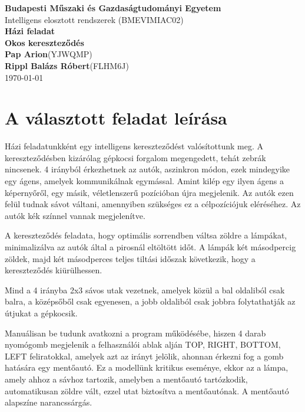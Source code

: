\documentclass[a4paper, 11pt]{article}
\begin{document}
\begin{titlepage}

    \begin{center}
        \vspace{0.3cm}
        \textbf{Budapesti Műszaki és Gazdaságtudományi Egyetem}\\
        \textmd{Intelligens elosztott rendszerek (BMEVIMIAC02)}\\[5cm]

        {\huge \bfseries Házi feladat }\\[0.8cm]
        {\huge \bfseries Okos kereszteződés }\\[0.8cm]
        \vspace{5.5cm}
        \Large \textbf{Pap Arion}(YJWQMP)\\
        \Large \textbf{Rippl Balázs Róbert}(FLHM6J)\\

        \vspace{1cm}
        \textsc{\Large \today}\\

    \end{center}
\end{titlepage}
\tableofcontents
\newpage

\section{A választott feladat leírása}
Házi feladatunkként egy intelligens kereszteződést valósítottunk meg.
A kereszteződésben kizárólag gépkocsi forgalom megengedett, tehát zebrák nincsenek.
4 irányból érkezhetnek az autók, aszinkron módon, ezek mindegyike egy ágens,
amelyek kommunikálnak egymással. Amint kilép egy ilyen ágens a képernyőről, egy másik,
véletlenszerű pozícióban újra megjelenik. Az autók ezen felül tudnak sávot váltani,
amennyiben szükséges ez a célpozíciójuk eléréséhez. Az autók kék színnel vannak megjelenítve.

A kereszteződés feladata, hogy optimális sorrendben váltsa zöldre a lámpákat, minimalizálva
az autók által a pirosnál eltöltött időt. A lámpák két másodpercig zöldek, majd két másodperces
teljes tiltási időszak következik, hogy a kereszteződés kiürülhessen.

Mind a 4 irányba 2x3 sávos utak vezetnek, amelyek közül
a bal oldaliból csak balra, a középsőből csak egyenesen, a jobb oldaliból csak jobbra folytathatják
az útjukat a gépkocsik.

Manuálisan be tudunk avatkozni a program működésébe,
hiszen 4 darab nyomógomb megjelenik a felhasználói ablak alján TOP, RIGHT, BOTTOM, LEFT feliratokkal,
amelyek azt az irányt jelölik, ahonnan érkezni fog a gomb hatására egy mentőautó.
Ez a modellünk kritikus eseménye, ekkor az a lámpa, amely ahhoz a sávhoz tartozik,
amelyben a mentőautó tartózkodik, automatikusan zöldre vált, ezzel utat biztosítva a mentőautónak.
A mentőautó alapszíne narancssárgás.
\end{document}
